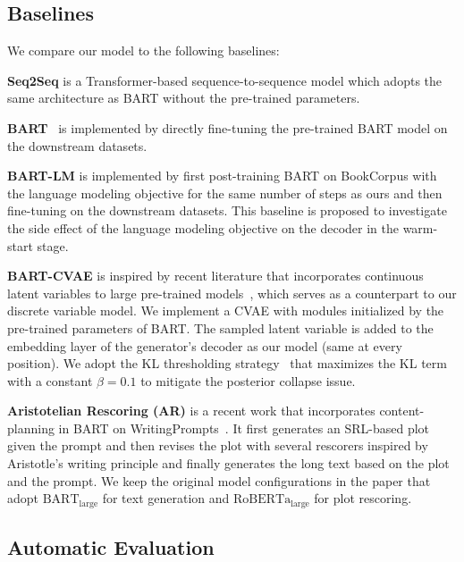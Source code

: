\documentclass[11pt]{article}
\begin{document}
\subsection{Baselines}

We compare our model to the following baselines:

\noindent\textbf{Seq2Seq} is a Transformer-based sequence-to-sequence model which adopts the same architecture as BART without the pre-trained parameters.

\noindent\textbf{BART}~\citep{bart} is implemented by directly fine-tuning the pre-trained BART model on the downstream datasets.

\noindent\textbf{BART-LM} is implemented by first post-training BART on BookCorpus with the language modeling objective for the same number of steps as ours and then fine-tuning on the downstream datasets. This baseline is proposed to investigate the side effect of the language modeling objective on the decoder in the warm-start stage.

\noindent\textbf{BART-CVAE} is inspired by recent literature that incorporates continuous latent variables to large pre-trained models~\citep{optimus}, which serves as a counterpart to our discrete variable model. We implement a CVAE with modules initialized by the pre-trained parameters of BART. The sampled latent variable is added to the embedding layer of the generator's decoder as our model (same at every position). We adopt the KL thresholding strategy~\citep{NIPS2016_ddeebdee} that maximizes the KL term with a constant $\beta=0.1$ to mitigate the posterior collapse issue.

\noindent\textbf{Aristotelian Rescoring (AR)} is a recent work that incorporates content-planning in BART on WritingPrompts~\citep{DBLP:conf/emnlp/Goldfarb-Tarrant20}. It first generates an SRL-based plot given the prompt and then revises the plot with several rescorers inspired by Aristotle's writing principle and finally generates the long text based on the plot and the prompt. We keep the original model configurations in the paper that adopt $\text{BART}_{\text{large}}$ for text generation and $\text{RoBERTa}_{\text{large}}$ for plot rescoring.

\subsection{Automatic Evaluation}
\end{document}
